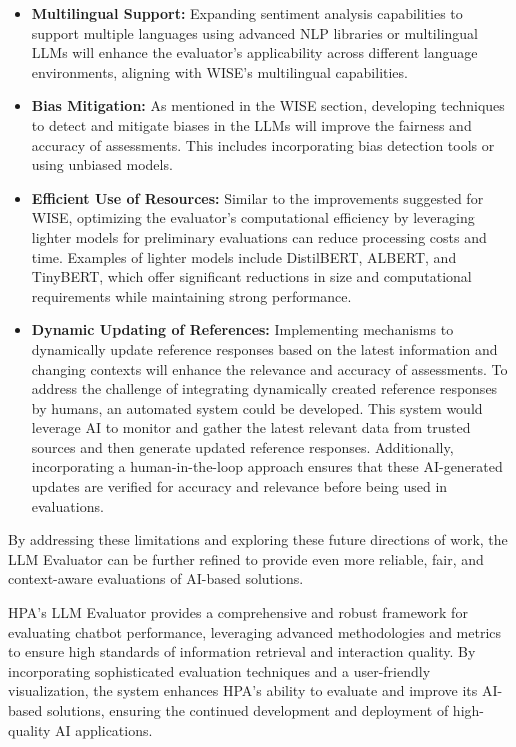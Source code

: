 \begin{itemize}
    \item \textbf{Multilingual Support:} Expanding sentiment analysis capabilities to support multiple languages using advanced NLP libraries or multilingual LLMs will enhance the evaluator's applicability across different language environments, aligning with WISE's multilingual capabilities. \cite{abdullah2021multilingual}
    \item \textbf{Bias Mitigation:} As mentioned in the WISE section, developing techniques to detect and mitigate biases in the LLMs will improve the fairness and accuracy of assessments. This includes incorporating bias detection tools or using unbiased models. \cite{ferrara2023fairness}
    \item \textbf{Efficient Use of Resources:} Similar to the improvements suggested for WISE, optimizing the evaluator's computational efficiency by leveraging lighter models for preliminary evaluations can reduce processing costs and time. Examples of lighter models include DistilBERT, ALBERT, and TinyBERT, which offer significant reductions in size and computational requirements while maintaining strong performance. \cite{sanh2019distilbert, lan2019albert, jiao2019tinybert}
    \item \textbf{Dynamic Updating of References:} Implementing mechanisms to dynamically update reference responses based on the latest information and changing contexts will enhance the relevance and accuracy of assessments. To address the challenge of integrating dynamically created reference responses by humans, an automated system could be developed. This system would leverage AI to monitor and gather the latest relevant data from trusted sources and then generate updated reference responses. Additionally, incorporating a human-in-the-loop approach ensures that these AI-generated updates are verified for accuracy and relevance before being used in evaluations. \cite{wu2022survey}
\end{itemize}

By addressing these limitations and exploring these future directions of work, the LLM Evaluator can be further refined to provide even more reliable, fair, and context-aware evaluations of AI-based solutions.

HPA's LLM Evaluator provides a comprehensive and robust framework for evaluating chatbot performance, leveraging advanced methodologies and metrics to ensure high standards of information retrieval and interaction quality. By incorporating sophisticated evaluation techniques and a user-friendly visualization, the system enhances HPA's ability to evaluate and improve its AI-based solutions, ensuring the continued development and deployment of high-quality AI applications.
